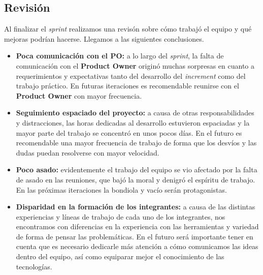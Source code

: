 \documentclass[10pt, a4paper]{article}
\begin{document}
\subsection{Revisión}

Al finalizar el \emph{sprint} realizamos una revisón sobre cómo trabajó el equipo y qué mejoras podrían hacerse. Llegamos a las siguientes conclusiones. 

\begin{itemize}
  \item \textbf{Poca comunicación con el PO:} a lo largo del \emph{sprint}, la falta de comunicación con el \textbf{Product Owner} originó muchas sorpresas en cuanto a requerimientos y expectativas tanto del desarrollo del \emph{increment} como del trabajo práctico. En futuras iteraciones es recomendable reunirse con el \textbf{Product Owner} con mayor frecuencia.
  \item \textbf{Seguimiento espaciado del proyecto:} a causa de otras responsabilidades y distracciones, las horas dedicadas al desarrollo estuvieron espaciadas y la mayor parte del trabajo se concentró en unos pocos días. En el futuro es recomendable una mayor frecuencia de trabajo de forma que los desvíos y las dudas puedan resolverse con mayor velocidad.
  \item \textbf{Poco asado:} evidentemente el trabajo del equipo se vio afectado por la falta de asado en las reuniones, que bajó la moral y denigró el espíritu de trabajo. En las próximas iteraciones la bondiola y vacío serán protagonistas.
  \item \textbf{Disparidad en la formación de los integrantes:} a causa de las distintas experiencias y líneas de trabajo de cada uno de los integrantes, nos encontramos con diferencias en la experiencia con las herramientas y variedad de forma de pensar las problemáticas. En el futuro será importante tener en cuenta que es necesario dedicarle más atención a cómo comunicamos las ideas dentro del equipo, así como equiparar mejor el conocimiento de las tecnologías.
\end{itemize}
\end{document}
